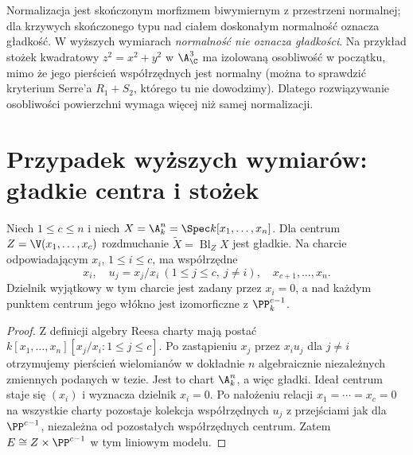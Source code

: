 \begin{uwaga}
Normalizacja jest skończonym morfizmem biwymiernym
z przestrzeni normalnej; dla krzywych skończonego typu
nad ciałem doskonałym normalność oznacza gładkość.
W wyższych wymiarach \emph{normalność nie oznacza
gładkości}. Na przykład stożek kwadratowy
$z^2=x^2+y^2$ w $\A^3_\C$ ma izolowaną osobliwość
w początku, mimo że jego pierścień współrzędnych
jest normalny (można to sprawdzić kryterium Serre'a
$R_1+S_2$, którego tu nie dowodzimy).
Dlatego rozwiązywanie osobliwości powierzchni
wymaga więcej niż samej normalizacji.
\end{uwaga}

\section{Przypadek wyższych wymiarów: gładkie centra i stożek}
\label{sec:ga5-higherdim}

\begin{twierdzenie}
\label{tw:ga5-smooth-center-model}
Niech $1\le c\le n$ i niech
$X=\A^n_k=\Spec k[x_1,\ldots,x_n]$.
Dla centrum $Z=\V(x_1,\ldots,x_c)$ rozdmuchanie
$\widetilde X=\operatorname{Bl}_Z X$ jest gładkie.
Na charcie odpowiadającym $x_i$, $1\le i\le c$,
ma współrzędne
\[
 x_i,\quad u_j=x_j/x_i\ (1\le j\le c,\ j\ne i),
 \quad x_{c+1},\ldots,x_n.
\]
Dzielnik wyjątkowy w tym charcie jest zadany
przez $x_i=0$, a nad każdym punktem centrum jego
włókno jest izomorficzne z $\PP^{c-1}_k$.
\end{twierdzenie}
\begin{proof}
Z definicji algebry Reesa charty mają postać
$k[x_1,\ldots,x_n][x_j/x_i:1\le j\le c]$.
Po zastąpieniu $x_j$ przez $x_i u_j$ dla $j\ne i$
otrzymujemy pierścień wielomianów w dokładnie
$n$ algebraicznie niezależnych zmiennych podanych
w tezie. Jest to chart $\A^n_k$, a więc gładki.
Ideał centrum staje się $(x_i)$ i wyznacza dzielnik
$x_i=0$. Po nałożeniu relacji $x_1=\cdots=x_c=0$
na wszystkie charty pozostaje kolekcja współrzędnych
$u_j$ z przejściami jak dla $\PP^{c-1}$,
niezależna od pozostałych współrzędnych centrum.
Zatem $E\cong Z\times\PP^{c-1}$ w tym liniowym modelu.
\end{proof}

